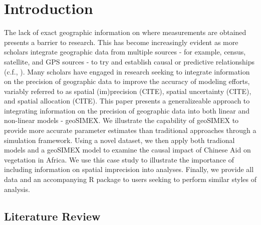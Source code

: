 \section{Introduction}
The lack of exact geographic information on where measurements are obtained presents a barrier to research.
This has become increasingly evident as more scholars integrate geographic data from multiple sources - for example, census, satellite, and GPS sources - to try and establish causal or predictive relationships (c.f., \cite{bare_assessing_2015,buntaine_titling_2015,gallo_mapping_2012,andam_measuring_2008}).
Many scholars have engaged in research seeking to integrate information on the precision of geographic data to improve the accuracy of modeling efforts, variably referred to as spatial (im)precision (CITE), spatial uncertainty (CITE), and spatial allocation (CITE).
This paper presents a generalizeable approach to integrating information on the precision of geographic data into both linear and non-linear models - geoSIMEX.
We illustrate the capability of geoSIMEX to provide more accurate parameter estimates than traditional approaches through a simulation framework. 
Using a novel dataset, we then apply both tradional models and a geoSIMEX model to examine the causal impact of Chinese Aid on vegetation in Africa.
We use this case study to illustrate the importance of including information on spatial imprecision into analyses.
Finally, we provide all data and an accompanying R package to users seeking to perform similar styles of analysis.

\subsection{Literature Review}

